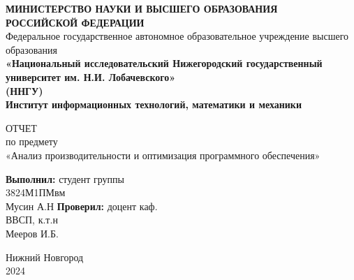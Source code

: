 \documentclass[a4paper,12pt]{article}
\begin{document}
\begin{titlepage}
    \begin{center}
      {\bfseries МИНИСТЕРСТВО НАУКИ И ВЫСШЕГО ОБРАЗОВАНИЯ \\
        РОССИЙСКОЙ ФЕДЕРАЦИИ}
      \\
      Федеральное государственное автономное образовательное учреждение высшего образования
      \\
      {\bfseries «Национальный исследовательский Нижегородский государственный университет им. Н.И. Лобачевского»\\(ННГУ)
        \\Институт информационных технологий, математики и механики} \\
    \end{center}

    \vspace{8em}

    \begin{center}
      ОТЧЕТ \\ по предмету \\
      «Анализ производительности и оптимизация программного обеспечения»
    \end{center}

    \vspace{5em}


    \begin{flushright}
      {\bfseries Выполнил:} студент группы\\3824М1ПМвм\\Мусин А.Н \underline{\hspace{3cm}} \linebreak\linebreak\linebreak
      {\bfseries Проверил:} доцент каф.\\ВВСП, к.т.н\\Мееров И.Б.\underline{\hspace{3cm}} 
    \end{flushright}


    \vspace{\fill}

    \begin{center}
      Нижний Новгород\\2024
    \end{center}

\end{titlepage}

\tableofcontents
\newpage
\end{document}

